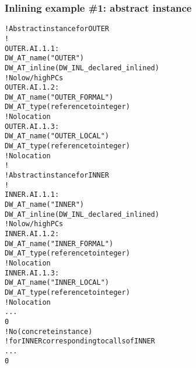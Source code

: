 \subsubsection{Inlining example \#1: abstract instance}
\label{app:inliningexample1abstractinstance}
\begin{alltt}
    ! Abstract instance for OUTER
    !
OUTER.AI.1.1:
        DW\-\_AT\-\_name("OUTER")
        DW\-\_AT\-\_inline(DW\-\_INL\-\_declared\-\_inlined)
        ! No low/high PCs
OUTER.AI.1.2:
            DW\-\_AT\-\_name("OUTER\_FORMAL")
            DW\-\_AT\-\_type(reference to integer)
            ! No location
OUTER.AI.1.3:
            DW\-\_AT\-\_name("OUTER\_LOCAL")
            DW\-\_AT\-\_type(reference to integer)
            ! No location
        !
        ! Abstract instance for INNER
        !
INNER.AI.1.1:
            DW\-\_AT\-\_name("INNER")
            DW\-\_AT\-\_inline(DW\-\_INL\-\_declared\-\_inlined)
            ! No low/high PCs
INNER.AI.1.2:
                DW\-\_AT\-\_name("INNER\_FORMAL")
                DW\-\_AT\-\_type(reference to integer)
                ! No location
INNER.AI.1.3:
                DW\-\_AT\-\_name("INNER\_LOCAL")
                DW\-\_AT\-\_type(reference to integer)
                ! No location
            ...
            0
        ! No  (concrete instance)
        ! for INNER corresponding to calls of INNER
        ...
        0
\end{alltt}


